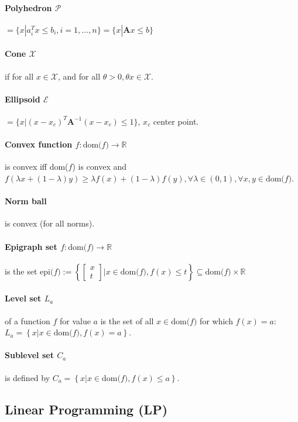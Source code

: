 \documentclass[landscape,a4paper,8pt]{scrartcl}
\newcommand{\mc}[1]{\mathcal{#1}}
\newcommand{\R}{\mathbb R}
\newcommand\vA{\bm{A}}
\newcommand{\Me}[1]{\begin{bmatrix}#1\end{bmatrix}} %
\begin{document}
\begin{multicols*}{3}
\paragraph{Polyhedron $\mc P$} $= \{ x | a_i^Tx \leq b_i, i = 1, \dots, n \} = \{ x | \vA x \leq b \}$
\paragraph{Cone $\mc X$} if for all $ x \in \mc X $, and for all $\theta > 0, \theta x \in \mc X$.
\paragraph{Ellipsoid $\mc E$} $= \{ x | (x-x_c)^T\vA^{-1}(x-x_c) \leq 1 \}$, $x_c$ center point.
\paragraph{Convex function $f : \text{dom($f$)} \rightarrow \R$} is convex iff dom($f$) is convex and
$f (\lambda x + (1 - \lambda)y) \geq \lambda f(x) + (1-\lambda)f(y), \forall \lambda \in (0, 1), \forall x, y \in \text{dom($f$)}$.
\paragraph{Norm ball} is convex (for all norms).
\paragraph{Epigraph set $f : \text{dom($f$)} \rightarrow \R$} is the set $\text{epi($f$)} :=
\left\{ \Me{x\\t} | x \in \text{dom($f$)}, f(x) \le t \right\} \subseteq \text{dom($f$)} \times \R$
\paragraph{Level set $L_a$} of a function $f$ for value $a$ is the set of all $x \in \text{dom($f$)}$ for which $f(x) = a$: $L_a = \left\{x | x \in \text{dom($f$)}, f(x) = a\right\}$.
\paragraph{Sublevel set $C_a$} is defined by $C_a = \left\{x | x \in \text{dom($f$)}, f(x) \le a\right\}$.


\subsection{Linear Programming (LP)}

\end{multicols*}
\end{document}
